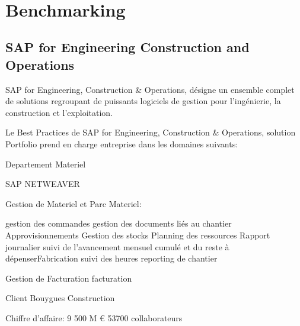 \documentclass[a4paper]{article}
\begin{document}
\maketitle

\hfill\\
\section{Benchmarking}
\subsection{SAP for Engineering Construction and Operations}
SAP for Engineering, Construction \& Operations, désigne un ensemble complet de solutions regroupant de puissants logiciels de gestion pour l’ingénierie, la construction et l’exploitation.

Le Best Practices de SAP for Engineering, Construction \& Operations, solution Portfolio prend en charge entreprise dans les domaines suivants:

{Departement Materiel}

SAP NETWEAVER

Gestion de Materiel et Parc Materiel: 

	gestion des commandes
	gestion des documents liés au chantier
	Approvisionnements
	Gestion des stocks
	Planning des ressources
	Rapport journalier 
	suivi de l’avancement mensuel cumulé et du reste à dépenserFabrication
	suivi des heures
	reporting de chantier
	 
Gestion de Facturation
	facturation

Client Bouygues Construction

Chiffre d'affaire: 9 500 M €
53700 collaborateurs
\end{document}

